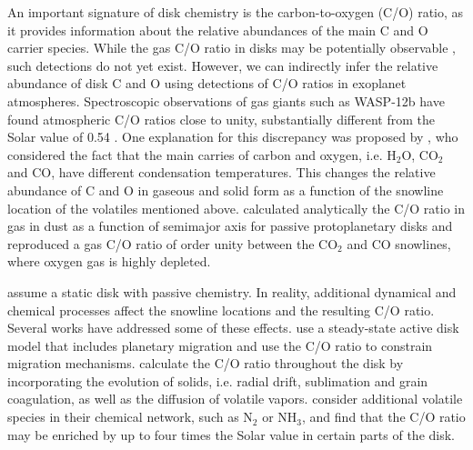 \documentclass[apj]{emulateapj}
\newcommand{\emgr}[1]{\emph{ \color{gray} #1}}
\begin{document}
An important signature of disk chemistry is the carbon-to-oxygen (C/O) ratio, as it provides information about the relative abundances of the main C and O carrier species. While the gas C/O ratio in disks may be potentially observable \citep{du15}, such detections do not yet exist. However, we can indirectly infer the relative abundance of disk C and O using detections of C/O ratios in exoplanet atmospheres. Spectroscopic observations of gas giants such as WASP-12b have found atmospheric C/O ratios close to unity, substantially different from the Solar value of 0.54 \citep{madhu11}. One explanation for this discrepancy was proposed by \citet{oberg11}, who considered the fact that the main carries of carbon and oxygen, i.e. H$_2$O, CO$_2$ and CO, have different condensation temperatures. This changes the relative abundance of C and O in gaseous and solid form as a function of the snowline location of the volatiles mentioned above. \citet{oberg11} calculated analytically the C/O ratio in gas in dust as a function of semimajor axis for passive protoplanetary disks and reproduced a gas C/O ratio of order unity between the CO$_2$ and CO snowlines, where oxygen gas is highly depleted.


 
\citet{oberg11} assume a static disk with passive chemistry. In reality, additional dynamical and chemical processes affect the snowline locations and the resulting C/O ratio. Several works have addressed some of these effects. \citet{madhu14} use a steady-state active disk model that includes planetary migration and use the C/O ratio to constrain migration mechanisms. \citealt{alidib14} calculate the C/O ratio throughout the disk by incorporating the evolution of solids, i.e. radial drift, sublimation and grain coagulation, as well as the diffusion of volatile vapors. \citet{thiabaud15} consider additional volatile species in their chemical network, such as N$_2$ or NH$_3$, and find that the C/O ratio may be enriched by up to four times the Solar value in certain parts of the disk.  
\end{document}
